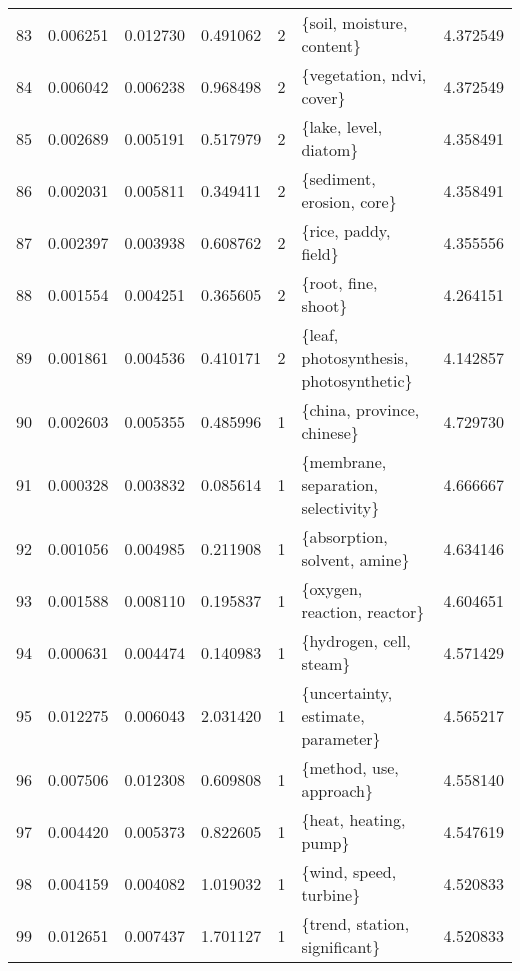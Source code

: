 \begin{tabular}{lrrrrlr}
83  &    0.006251 &  0.012730 &        0.491062 &           2 &               \{soil, moisture, content\} &  4.372549 \\
84  &    0.006042 &  0.006238 &        0.968498 &           2 &               \{vegetation, ndvi, cover\} &  4.372549 \\
85  &    0.002689 &  0.005191 &        0.517979 &           2 &                   \{lake, level, diatom\} &  4.358491 \\
86  &    0.002031 &  0.005811 &        0.349411 &           2 &               \{sediment, erosion, core\} &  4.358491 \\
87  &    0.002397 &  0.003938 &        0.608762 &           2 &                    \{rice, paddy, field\} &  4.355556 \\
88  &    0.001554 &  0.004251 &        0.365605 &           2 &                     \{root, fine, shoot\} &  4.264151 \\
89  &    0.001861 &  0.004536 &        0.410171 &           2 &  \{leaf, photosynthesis, photosynthetic\} &  4.142857 \\
90  &    0.002603 &  0.005355 &        0.485996 &           1 &              \{china, province, chinese\} &  4.729730 \\
91  &    0.000328 &  0.003832 &        0.085614 &           1 &     \{membrane, separation, selectivity\} &  4.666667 \\
92  &    0.001056 &  0.004985 &        0.211908 &           1 &            \{absorption, solvent, amine\} &  4.634146 \\
93  &    0.001588 &  0.008110 &        0.195837 &           1 &             \{oxygen, reaction, reactor\} &  4.604651 \\
94  &    0.000631 &  0.004474 &        0.140983 &           1 &                 \{hydrogen, cell, steam\} &  4.571429 \\
95  &    0.012275 &  0.006043 &        2.031420 &           1 &      \{uncertainty, estimate, parameter\} &  4.565217 \\
96  &    0.007506 &  0.012308 &        0.609808 &           1 &                 \{method, use, approach\} &  4.558140 \\
97  &    0.004420 &  0.005373 &        0.822605 &           1 &                   \{heat, heating, pump\} &  4.547619 \\
98  &    0.004159 &  0.004082 &        1.019032 &           1 &                  \{wind, speed, turbine\} &  4.520833 \\
99  &    0.012651 &  0.007437 &        1.701127 &           1 &           \{trend, station, significant\} &  4.520833 \\

\end{tabular}
